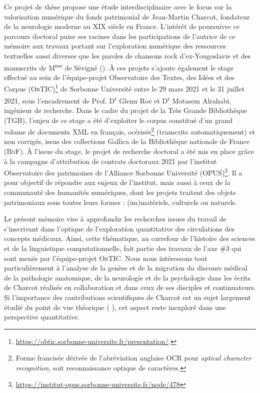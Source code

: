 Ce projet de thèse propose une étude interdisciplinaire avec le focus sur la valorisation numérique du fonds patrimonial de Jean-Martin Charcot, fondateur de la neurologie moderne au XIX\ieme{} siècle en France. 
L'intérêt de poursuivre ce parcours doctoral puise ses racines dans les participations de l'autrice de ce mémoire aux travaux portant sur l'exploration numérique des ressources textuelles aussi diverses que les paroles de chansons rock d'ex-Yougoslavie \citep{petkovic2019creation} et des manuscrits de M\textsuperscript{me} de Sévigné (\citealp{gabay2020quantifying,gabay2021katabase}). 
À ces projets s'ajoute également le stage effectué au sein de l'équipe-projet Observatoire des Textes, des Idées et des Corpus (\textsc{ObTIC})\footnote{\url{https://obtic.sorbonne-universite.fr/presentation/}.} de Sorbonne Université entre le 29 mars 2021 et le 31 juillet 2021, sous l'encadrement de Prof. D\textsuperscript{r} Glenn Roe et D\textsuperscript{r} Motasem Alrahabi, ingénieur de recherche. Dans le cadre du projet de la Très Grande Bibliothèque (\textsc{TGB}), l'enjeu de ce stage a été d'exploiter le corpus constitué d'un grand volume de documents \textsc{XML} en français, océrisés\footnote{Forme francisée dérivée de l'abréviation anglaise \textsc{OCR} pour \textit{optical character recognition}, soit \og{}reconnaissance optique de caractères\fg{}.} (transcrits automatiquement) et non corrigés, issus des collections Gallica de la Bibliothèque nationale de France (\textsc{BnF}). 
À l'issue du stage, le projet de recherche doctoral a été mis en place grâce à la campagne d'attribution de contrats doctoraux 2021 par l'institut Observatoire des patrimoines de l'Alliance Sorbonne Université (\textsc{OPUS})\footnote{\url{https://institut-opus.sorbonne-universite.fr/node/478}}. Il a pour objectif de répondre aux enjeux de l'institut, mais aussi à ceux de la communauté des humanités numériques, dont les projets traitent des objets patrimoniaux sous toutes leurs formes : (im)matériels, culturels ou naturels.  

Le présent mémoire vise à approfondir les recherches issues du travail de \citet{petkovic2023circulation} s'inscrivant dans l'optique de l'exploration quantitative des circulations des concepts médicaux. Ainsi, cette thématique, au carrefour de l'histoire des sciences et de la linguistique computationnelle, fait partie des travaux de l'axe \#3 qui sont menés par l'équipe-projet \textsc{ObTIC}. Nous nous intéressons tout particulièrement à l'analyse de la genèse et de la migration du discours médical de la pathologie anatomique, de la neurologie et de la psychologie dans les écrits de Charcot réalisés en collaboration et dans ceux de ses disciples et continuateurs. Si l'importance des contributions scientifiques de Charcot est un sujet largement étudié du point de vue théorique (\citealp{bogousslavsky2011following,broussolle2012,camargo2024} ), cet aspect reste inexploré dans une perspective quantitative.


